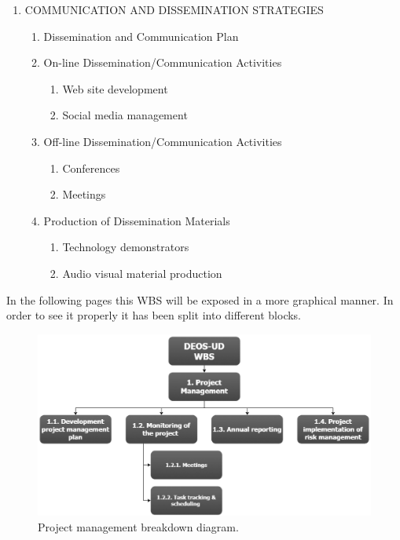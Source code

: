 \begin{enumerate}[label*=\arabic*.]
	\item COMMUNICATION AND DISSEMINATION STRATEGIES
	
	\begin{enumerate}[label*=\arabic*.]
		\item Dissemination and Communication Plan
		\item On-line Dissemination/Communication Activities
		\begin{enumerate}[label*=\arabic*.]
			\item Web site development
			\item Social media management
		\end{enumerate}
		\item Off-line Dissemination/Communication Activities
		\begin{enumerate}[label*=\arabic*.]
			\item Conferences
			\item Meetings
		\end{enumerate}
		\item Production of Dissemination Materials
		\begin{enumerate}[label*=\arabic*.]
			\item Technology demonstrators
			\item Audio visual material production
		\end{enumerate}
	\end{enumerate}
	
\end{enumerate}

In the following pages this WBS will be exposed in a more graphical manner. In order to see it properly it has been split into different blocks.

\begin{figure}[H]
	\centering
	\includegraphics[width=\textwidth]{./sections/2.WBS/WBS_Section1}
	\caption[Project management breakdown diagram]{Project management breakdown diagram.}
	\label{fig:WBS_Section1}
\end{figure}

